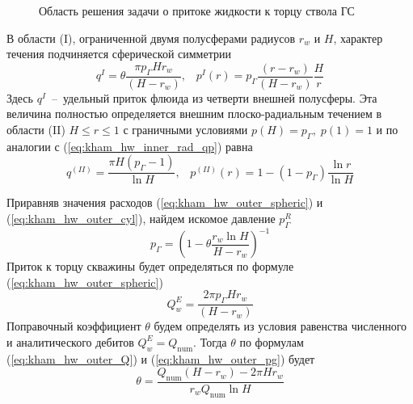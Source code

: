 \documentclass{article}
\begin{document}
\begin{figure}[!ht]
\centering

\caption{Область решения задачи о притоке жидкости к торцу ствола ГС}
\label{fig:kham_well_end_sch}
\end{figure}

В области (I), ограниченной двумя полусферами радиусов $r_w$ и $H$, характер течения подчиняется сферической симметрии
\begin{equation}
\displaystyle
q^I = \theta \dfrac{\pi p_{\Gamma} H r_w}{\left(H - r_w\right)} , \;\;\;
p^I(r) = p_{\Gamma}\dfrac{\left(r-r_w\right)}{\left(H-r_w\right)}\dfrac{H}{r}
\label{eq:kham_hw_outer_spheric}
\end{equation}
Здесь $q^I$~--~удельный приток флюида из четверти внешней полусферы. Эта величина полностью определяется внешним плоско-радиальным течением в области (II) $H \le r \le 1$ с граничными условиями $p(H) = p_{\Gamma}, \; p(1)= 1$ и по аналогии с (\ref{eq:kham_hw_inner_rad_qp}) равна
\begin{equation}
\displaystyle
q^{(II)} = \dfrac{\pi H \left( p_{\Gamma} - 1 \right)}{ \ln{H }}, \;\;\;
p^{(II)}(r) = 1 - \left(1-p_{\Gamma}\right) \dfrac{\ln{r}}{\ln{H}}
\label{eq:kham_hw_outer_cyl}
\end{equation}

Приравняв значения расходов (\ref{eq:kham_hw_outer_spheric}) и (\ref{eq:kham_hw_outer_cyl}), найдем искомое давление $p^R_{\Gamma}$
\begin{equation}
\displaystyle
p_{\Gamma} = \left(1- \theta \dfrac{r_w \ln{H}}{H - r_w}\right)^{-1}
\label{eq:kham_hw_outer_pg}
\end{equation}
Приток к торцу скважины будет определяться по формуле (\ref{eq:kham_hw_outer_spheric})
\begin{equation}
\displaystyle
Q_w^E = \dfrac{2\pi p_{\Gamma} H r_w}{\left(H - r_w\right)}
\label{eq:kham_hw_outer_Q}
\end{equation}
Поправочный коэффициент $\theta$ будем определять из условия равенства численного и аналитического дебитов $Q_w^E = Q_{\text{num}}$. Тогда $\theta$ по формулам (\ref{eq:kham_hw_outer_Q}) и (\ref{eq:kham_hw_outer_pg}) будет
\begin{equation}
\displaystyle
\theta = \dfrac{Q_{\text{num}} \left(H - r_w \right) - 2 \pi H r_w}{r_w Q_{\text{num}} \ln{H}}
\label{eq:kham_theta_spheric}
\end{equation}
\end{document}
